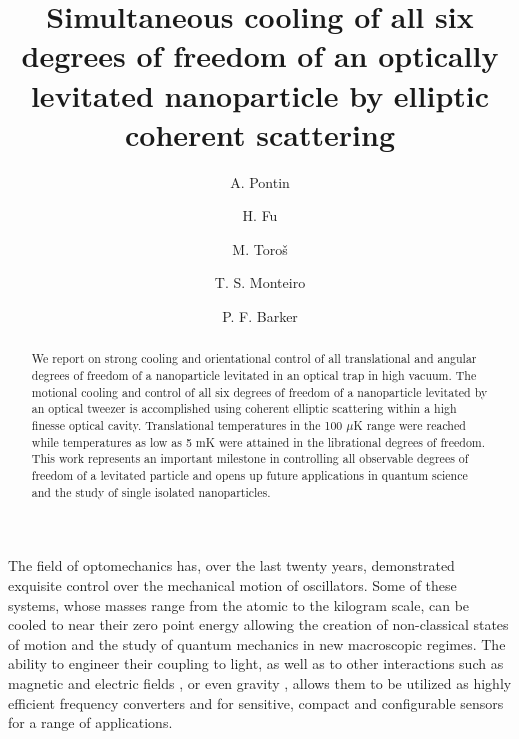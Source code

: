 \documentclass[aps,pra,twocolumn,nopacs,superscriptaddress,groupedaddress]{revtex4}
\begin{document}

\title[]{Simultaneous cooling of all six degrees of freedom of an optically levitated nanoparticle by elliptic coherent scattering}


\author{A. Pontin}

\author{H. Fu}%
%

\author{M. Toro\v{s}}%
%

\author{T. S. Monteiro}%
%


\author{P. F. Barker}
%



\begin{abstract}
We report on strong cooling and orientational control of all translational and angular degrees of freedom of a nanoparticle levitated in an optical trap in high vacuum.  The motional cooling and control of all six degrees of freedom of a nanoparticle levitated by an optical tweezer is accomplished using coherent elliptic scattering within a high finesse optical cavity. Translational temperatures in the 100 $\mu$K range were reached while temperatures as low as 5 mK were attained in the librational degrees of freedom. This work represents an important milestone in controlling all observable degrees of freedom of a levitated particle and opens up future applications in quantum science and the study of single isolated nanoparticles.
\end{abstract}

\maketitle

The field of optomechanics has, over the last twenty years, demonstrated exquisite control over the mechanical motion of oscillators. Some of these systems, whose masses range from the atomic to the kilogram scale, can be cooled to near their zero point energy allowing the creation of non-classical states of motion\cite{seis} and the study of quantum mechanics in new macroscopic regimes\cite{silanpaa}. The ability to engineer their coupling to light, as well as to other interactions such as magnetic \cite{gavartin2012hybrid} and electric fields \cite{regal}, or even gravity \cite{middlemiss}, allows them to be utilized as highly efficient frequency converters and for sensitive, compact and configurable sensors for a range of applications.
\end{document}
